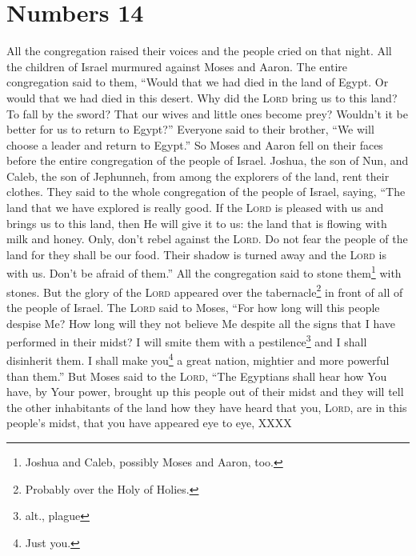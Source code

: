 \section{Numbers 14}\label{Numbers 14}
\begin{enumerate}[align=center]
     All the congregation raised their voices and the people cried on that night.%
     All the children of Israel murmured against Moses and Aaron. The entire congregation said to them, ``Would that we had died in the land of Egypt. Or would that we had died in this desert.%
     Why did the \textsc{Lord} bring us to this land? To fall by the sword? That our wives and little ones become prey? Wouldn't it be better for us to return to Egypt?''%
     Everyone said to their brother, ``We will choose a leader and return to Egypt.''%
     So Moses and Aaron fell on their faces before the entire congregation of the people of Israel.%
     Joshua, the son of Nun, and Caleb, the son of Jephunneh, from among the explorers of the land, rent their clothes.%
     They said to the whole congregation of the people of Israel, saying, ``The land that we have explored is really good.%
     If the \textsc{Lord} is pleased with us and brings us to this land, then He will give it to us: the land that is flowing with milk and honey.%
     Only, don't rebel against the \textsc{Lord}. Do not fear the people of the land for they shall be our food. Their shadow is turned away and the \textsc{Lord} is with us. Don't be afraid of them.''%
     All the congregation said to stone them\footnote{Joshua and Caleb, possibly Moses and Aaron, too.} with stones. But the glory of the \textsc{Lord} appeared over the tabernacle\footnote{Probably over the Holy of Holies.} in front of all of the people of Israel.%
     The \textsc{Lord} said to Moses, ``For how long will this people despise Me? How long will they not believe Me despite all the signs that I have performed in their midst?%
     I will smite them with a pestilence\footnote{alt., plague} and I shall disinherit them. I shall make you\footnote{Just you.} a great nation, mightier and more powerful than them.''%
     But Moses said to the \textsc{Lord}, ``The Egyptians shall hear how You have, by Your power, brought up this people out of their midst%
     and they will tell the other inhabitants of the land how they have heard that you, \textsc{Lord}, are in this people's midst, that you have appeared eye to eye, XXXX%

\end{enumerate}
